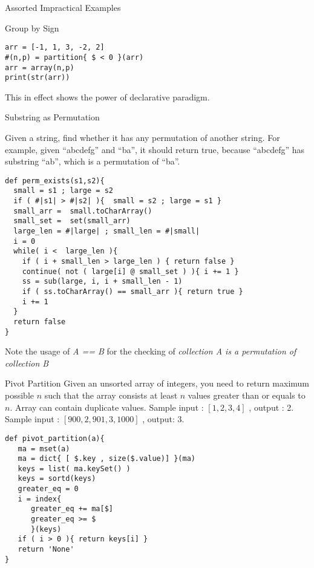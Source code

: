 \begin{section}{Assorted Impractical Examples}
\begin{subsection}{Group by Sign}
\begin{center}\begin{minipage}{\linewidth}
\begin{lstlisting}[style=JexlStyle]
arr = [-1, 1, 3, -2, 2] 
#(n,p) = partition{ $ < 0 }(arr)
arr = array(n,p)
print(str(arr))
\end{lstlisting}  
\end{minipage}\end{center} 
This in effect shows the power of declarative paradigm.
\end{subsection}

\begin{subsection}{Substring as Permutation}

Given a string, find whether it has any permutation of another string. 
For example, given ``abcdefg'' and ``ba'', it should return true, 
because ``abcdefg'' has substring ``ab'', which is a permutation of ``ba''.

\begin{center}\begin{minipage}{\linewidth}
\begin{lstlisting}[style=JexlStyle]
def perm_exists(s1,s2){
  small = s1 ; large = s2 
  if ( #|s1| > #|s2| ){  small = s2 ; large = s1 }
  small_arr =  small.toCharArray()
  small_set =  set(small_arr)
  large_len = #|large| ; small_len = #|small|
  i = 0 
  while( i <  large_len ){
    if ( i + small_len > large_len ) { return false } 
    continue( not ( large[i] @ small_set ) ){ i += 1 }
    ss = sub(large, i, i + small_len - 1)
    if ( ss.toCharArray() == small_arr ){ return true }
    i += 1
  }
  return false 
}
\end{lstlisting}  
\end{minipage}\end{center} 
Note the usage of \emph{A == B } for the checking of \emph{collection A is a permutation of collection B}
\end{subsection}

\begin{subsection}{Pivot Partition}
Given an unsorted array of integers, you need to return maximum possible $n$ 
such that the array consists at least $n$ values greater than or equals to $n$. 
Array can contain duplicate values. 
Sample input : $[1, 2, 3, 4]$ , output : 2. 
Sample input : $[900, 2, 901, 3, 1000]$ , output: 3.

\begin{center}\begin{minipage}{\linewidth}
\begin{lstlisting}[style=JexlStyle]
def pivot_partition(a){
   ma = mset(a)
   ma = dict{ [ $.key , size($.value)] }(ma)
   keys = list( ma.keySet() )
   keys = sortd(keys)
   greater_eq = 0 
   i = index{
      greater_eq += ma[$]
      greater_eq >= $  
      }(keys)
   if ( i > 0 ){ return keys[i] }
   return 'None'
}
\end{lstlisting}  
\end{minipage}\end{center} 
\end{subsection}


\end{section}
